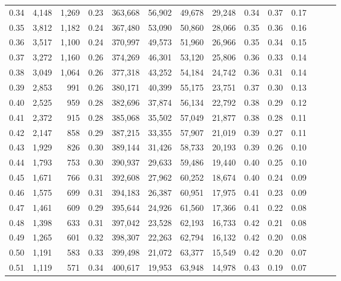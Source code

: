 \begin{tabular}{rrrrrrrrrrrrrr}
0.34 &   4,148 &  1,269 &  0.23 &  363,668 &   56,902 &  49,678 &  29,248 &  0.34 &  0.37 &      0.17 \\
0.35 &   3,812 &  1,182 &  0.24 &  367,480 &   53,090 &  50,860 &  28,066 &  0.35 &  0.36 &      0.16 \\
0.36 &   3,517 &  1,100 &  0.24 &  370,997 &   49,573 &  51,960 &  26,966 &  0.35 &  0.34 &      0.15 \\
0.37 &   3,272 &  1,160 &  0.26 &  374,269 &   46,301 &  53,120 &  25,806 &  0.36 &  0.33 &      0.14 \\
0.38 &   3,049 &  1,064 &  0.26 &  377,318 &   43,252 &  54,184 &  24,742 &  0.36 &  0.31 &      0.14 \\
0.39 &   2,853 &    991 &  0.26 &  380,171 &   40,399 &  55,175 &  23,751 &  0.37 &  0.30 &      0.13 \\
0.40 &   2,525 &    959 &  0.28 &  382,696 &   37,874 &  56,134 &  22,792 &  0.38 &  0.29 &      0.12 \\
0.41 &   2,372 &    915 &  0.28 &  385,068 &   35,502 &  57,049 &  21,877 &  0.38 &  0.28 &      0.11 \\
0.42 &   2,147 &    858 &  0.29 &  387,215 &   33,355 &  57,907 &  21,019 &  0.39 &  0.27 &      0.11 \\
0.43 &   1,929 &    826 &  0.30 &  389,144 &   31,426 &  58,733 &  20,193 &  0.39 &  0.26 &      0.10 \\
0.44 &   1,793 &    753 &  0.30 &  390,937 &   29,633 &  59,486 &  19,440 &  0.40 &  0.25 &      0.10 \\
0.45 &   1,671 &    766 &  0.31 &  392,608 &   27,962 &  60,252 &  18,674 &  0.40 &  0.24 &      0.09 \\
0.46 &   1,575 &    699 &  0.31 &  394,183 &   26,387 &  60,951 &  17,975 &  0.41 &  0.23 &      0.09 \\
0.47 &   1,461 &    609 &  0.29 &  395,644 &   24,926 &  61,560 &  17,366 &  0.41 &  0.22 &      0.08 \\
0.48 &   1,398 &    633 &  0.31 &  397,042 &   23,528 &  62,193 &  16,733 &  0.42 &  0.21 &      0.08 \\
0.49 &   1,265 &    601 &  0.32 &  398,307 &   22,263 &  62,794 &  16,132 &  0.42 &  0.20 &      0.08 \\
0.50 &   1,191 &    583 &  0.33 &  399,498 &   21,072 &  63,377 &  15,549 &  0.42 &  0.20 &      0.07 \\
0.51 &   1,119 &    571 &  0.34 &  400,617 &   19,953 &  63,948 &  14,978 &  0.43 &  0.19 &      0.07 \\

\end{tabular}
